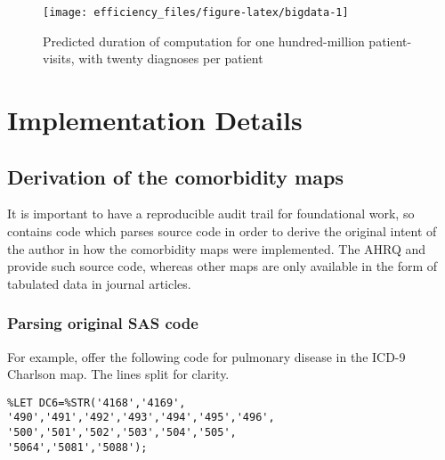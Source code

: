 \documentclass[article]{jss}
\begin{document}
\begin{CodeChunk}
\begin{figure}

{\centering \texttt{[image: efficiency\_files/figure-latex/bigdata-1]} 

}

\caption[Predicted duration of computation for one hundred-million patient-visits, with twenty diagnoses per patient]{Predicted duration of computation for one hundred-million patient-visits, with twenty diagnoses per patient}\label{fig:bigdata}
\end{figure}
\end{CodeChunk}

\hypertarget{implementation-details}{%
\section{Implementation Details}\label{implementation-details}}

\hypertarget{derivation-of-the-comorbidity-maps}{%
\subsection{Derivation of the comorbidity
maps}\label{derivation-of-the-comorbidity-maps}}

It is important to have a reproducible audit trail for foundational
work, so  contains code which parses  source code
in order to derive the original intent of the author in how the
comorbidity maps were implemented. The AHRQ and
\citeauthor{quan_updating_2011} provide such  source code,
whereas other maps are only available in the form of tabulated data in
journal articles.

\hypertarget{parsing-original-sas-code}{%
\subsubsection{Parsing original SAS
code}\label{parsing-original-sas-code}}

For example, \citeauthor{quan_updating_2011} offer the following code
for pulmonary disease in the ICD-9 Charlson map. The lines split for
clarity.

\begin{verbatim}
%LET DC6=%STR('4168','4169',
'490','491','492','493','494','495','496',
'500','501','502','503','504','505',
'5064','5081','5088');
\end{verbatim}
\end{document}
